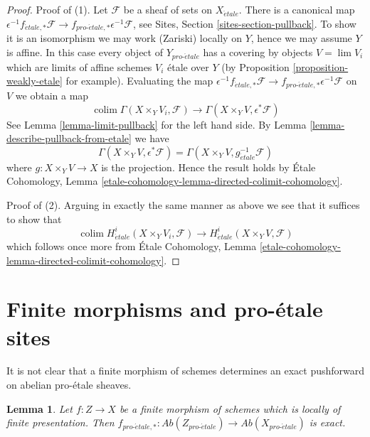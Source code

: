 \documentclass{stacks-project}
\theoremstyle{plain}
\newtheorem{lemma}[subsection]{Lemma}
\theoremstyle{definition}
\theoremstyle{remark}
\numberwithin{equation}{subsection}
\def\lim{\mathop{\mathrm{lim}}\nolimits}
\def\colim{\mathop{\mathrm{colim}}\nolimits}
\def\proetale{{pro\text{-}\acute{e}tale}}
\def\etale{{\acute{e}tale}}
\begin{document}
\begin{proof}
Proof of (1). Let $\mathcal{F}$ be a sheaf of sets on $X_\etale$. There
is a canonical map $\epsilon^{-1}f_{\etale, *}\mathcal{F} \to
f_{\proetale, *}\epsilon^{-1}\mathcal{F}$, see
Sites, Section \ref{sites-section-pullback}.
To show it is an isomorphism we may work (Zariski) locally on $Y$, hence
we may assume $Y$ is affine. In this case
every object of $Y_\proetale$ has a covering by objects $V = \lim V_i$
which are limits of affine schemes $V_i$ \'etale over $Y$ (by
Proposition \ref{proposition-weakly-etale}
for example). Evaluating the map
$\epsilon^{-1}f_{\etale, *}\mathcal{F} \to
f_{\proetale, *}\epsilon^{-1}\mathcal{F}$
on $V$ we obtain a map
$$
\colim \Gamma(X \times_Y V_i, \mathcal{F})
\longrightarrow
\Gamma(X \times_Y V, \epsilon^*\mathcal{F})
$$
See Lemma \ref{lemma-limit-pullback} for the left hand side.
By Lemma \ref{lemma-describe-pullback-from-etale} we have
$$
\Gamma(X \times_Y V, \epsilon^*\mathcal{F}) =
\Gamma(X \times_Y V, g_\etale^{-1}\mathcal{F})
$$
where $g : X \times_Y V \to X$ is the projection. Hence the result holds by
\'Etale Cohomology, Lemma
\ref{etale-cohomology-lemma-directed-colimit-cohomology}.

\medskip\noindent
Proof of (2). Arguing in exactly the same manner as above
we see that it suffices to show that
$$
\colim H^i_\etale(X \times_Y V_i, \mathcal{F})
\longrightarrow
H^i_\etale(X \times_Y V, \mathcal{F})
$$
which follows once more from \'Etale Cohomology, Lemma
\ref{etale-cohomology-lemma-directed-colimit-cohomology}.
\end{proof}







\section{Finite morphisms and pro-\'etale sites}
\label{section-finite}

\noindent
It is not clear that a finite morphism of schemes determines
an exact pushforward on abelian pro-\'etale sheaves.

\begin{lemma}
\label{lemma-finite}
Let $f : Z \to X$ be a finite morphism of schemes which is
locally of finite presentation. Then
$f_{\proetale, *} : \textit{Ab}(Z_\proetale) \to \textit{Ab}(X_\proetale)$
is exact.
\end{lemma}
\end{document}
